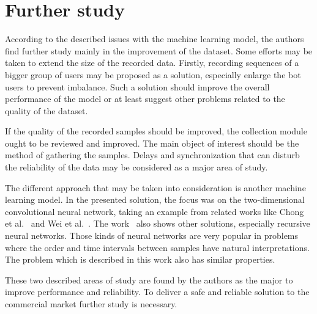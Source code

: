 \section{Further study}\label{sec:further-study}
According to the described issues with the machine learning model, the authors find further study mainly in the improvement of the dataset.
Some efforts may be taken to extend the size of the recorded data.
Firstly, recording sequences of a bigger group of users may be proposed as a solution, especially enlarge the bot users to prevent imbalance.
Such a solution should improve the overall performance of the model or at least suggest other problems related to the quality of the dataset.

If the quality of the recorded samples should be improved, the collection module ought to be reviewed and improved.
The main object of interest should be the method of gathering the samples.
Delays and synchronization that can disturb the reliability of the data may be considered as a major area of study.

The different approach that may be taken into consideration is another machine learning model.
In the presented solution, the focus was on the two-dimensional convolutional neural network, taking an example from related works like Chong et al.~\cite{Main} and Wei et al.~\cite{a-deep-learning-approach-to-web-bot-detection-using-mouse-behavioral-biometrics}.
The work~\cite{Main} also shows other solutions, especially recursive neural networks.
Those kinds of neural networks are very popular in problems where the order and time intervals between samples have natural interpretations.
The problem which is described in this work also has similar properties.

These two described areas of study are found by the authors as the major to improve performance and reliability.
To deliver a safe and reliable solution to the commercial market further study is necessary.
